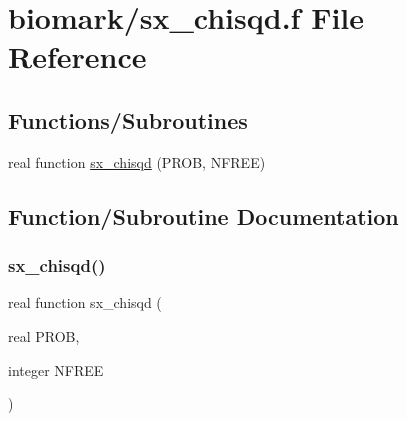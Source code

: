 \hypertarget{sx__chisqd_8f}{}\section{biomark/sx\+\_\+chisqd.f File Reference}
\label{sx__chisqd_8f}
\subsection*{Functions/\+Subroutines}
\begin{DoxyCompactItemize}
\item 
real function \hyperlink{sx__chisqd_8f_ab8040989fd6206355b583256f4c28679}{sx\+\_\+chisqd} (P\+R\+OB, N\+F\+R\+EE)
\end{DoxyCompactItemize}


\subsection{Function/\+Subroutine Documentation}
\mbox{\label{sx__chisqd_8f_ab8040989fd6206355b583256f4c28679}} 
\subsubsection{\texorpdfstring{sx\+\_\+chisqd()}{sx\_chisqd()}}
{\footnotesize\ttfamily real function sx\+\_\+chisqd (\begin{DoxyParamCaption}\item[{real}]{P\+R\+OB,  }\item[{integer}]{N\+F\+R\+EE }\end{DoxyParamCaption})}

